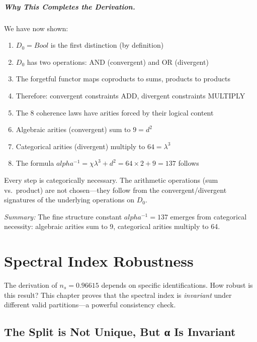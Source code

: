 \documentclass[11pt,a4paper]{book}
\def\alpha{alpha}%
\def\text#1{#1}%
\def\texorpdfstring#1#2{#2}%
\begin{document}
\paragraph{Why This Completes the Derivation.}

We have now shown:

\begin{enumerate}
\item $D_0 = \text{Bool}$ is the first distinction (by definition)
\item $D_0$ has two operations: AND (convergent) and OR (divergent)
\item The forgetful functor maps coproducts to sums, products to products
\item Therefore: convergent constraints ADD, divergent constraints MULTIPLY
\item The 8 coherence laws have arities forced by their logical content
\item Algebraic arities (convergent) sum to $9 = d^2$
\item Categorical arities (divergent) multiply to $64 = \lambda^3$
\item The formula $\alpha^{-1} = \chi \lambda^3 + d^2 = 64 \times 2 + 9 = 137$ follows
\end{enumerate}

Every step is categorically necessary. The arithmetic operations (sum vs.\ product)
are not chosen---they follow from the convergent/divergent signatures of the 
underlying operations on $D_0$.

\medskip
\noindent\textit{Summary:} The fine structure constant $\alpha^{-1} = 137$ emerges from 
categorical necessity: algebraic arities sum to 9, categorical arities multiply to 64.

\chapter{Spectral Index Robustness}
\label{chap:spectral-index-robustness}

The derivation of $n_s = 0.96615$ depends on specific identifications. How robust is 
this result? This chapter proves that the spectral index is \emph{invariant} under 
different valid partitions—a powerful consistency check.

\section{The Split is Not Unique, But \texorpdfstring{$\alpha$}{α} Is Invariant}
\label{sec:alpha-robustness}
\end{document}
